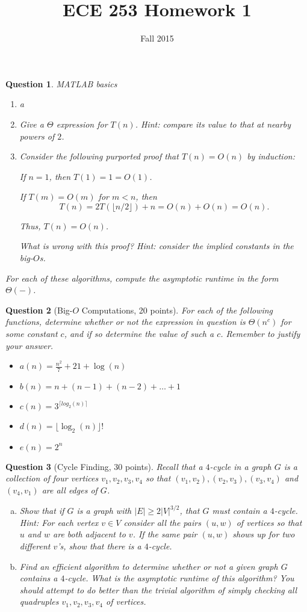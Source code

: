 \documentclass{article}
\title{ECE 253 Homework 1}
\date{Fall 2015}
\newtheorem{ques}{Question}
\begin{document}
\maketitle

\begin{ques}
MATLAB basics
\begin{enumerate}[(1)]
\item a
\item Give a $\Theta$ expression for $T(n)$. Hint: compare its value to that at nearby powers of $2$.
\item Consider the following purported proof that $T(n)=O(n)$ by induction:

\noindent If $n=1$, then $T(1)=1=O(1)$.

\noindent If $T(m)=O(m)$ for $m < n$, then
$$
T(n) =2T(\lfloor n/2\rfloor) + n = O(n) + O(n) = O(n).
$$

\noindent Thus, $T(n)=O(n)$.

\smallskip \noindent What is wrong with this proof? Hint: consider the implied constants in the big-$O$s.
\end{enumerate}
For each of these algorithms, compute the asymptotic runtime in the form $\Theta(-)$.
\end{ques}

\begin{ques}[Big-$O$ Computations, 20 points]
For each of the following functions, determine whether or not the expression in question is $\Theta(n^c)$ for some constant $c$, and if so determine the value of such a $c$. Remember to justify your answer.
\begin{itemize}
\item $a(n) = \frac{n^2}{7} + 21 + \log(n)$
\item $b(n) = n+(n-1)+(n-2)+\ldots+1$
\item $c(n) = 3^{\lceil log_2(n) \rceil}$
\item $d(n) = \lfloor \log_2(n) \rfloor !$
\item $e(n) = 2^n$
\end{itemize}
\end{ques}

\begin{ques}[Cycle Finding, 30 points]
Recall that a $4$-cycle in a graph $G$ is a collection of four vertices $v_1,v_2,v_3,v_4$ so that $(v_1,v_2),(v_2,v_3),(v_3,v_4)$ and $(v_4,v_1)$ are all edges of $G$.
\begin{enumerate}[(a)]
\item Show that if $G$ is a graph with $|E|\geq 2|V|^{3/2}$, that $G$ must contain a $4$-cycle. Hint: For each vertex $v\in V$ consider all the pairs $(u,w)$ of vertices so that $u$ and $w$ are both adjacent to $v$. If the same pair $(u,w)$ shows up for two different $v$'s, show that there is a $4$-cycle.
\item Find an efficient algorithm to determine whether or not a given graph $G$ contains a $4$-cycle. What is the asymptotic runtime of this algorithm? You should attempt to do better than the trivial algorithm of simply checking all quadruples $v_1,v_2,v_3,v_4$ of vertices.
\end{enumerate}
\end{ques}
\end{document}
